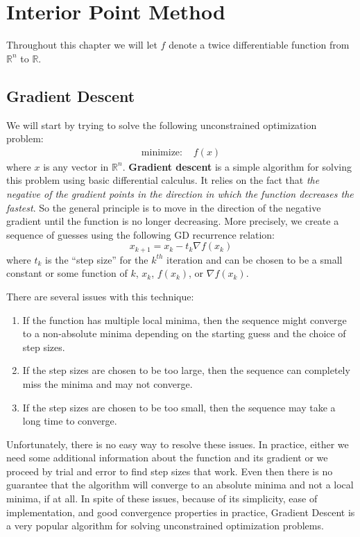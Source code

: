 \documentclass[
]{book}
\providecommand{\tightlist}{%
  \setlength{\itemsep}{0pt}\setlength{\parskip}{0pt}}
\theoremstyle{definition}
\theoremstyle{definition}
\theoremstyle{definition}
\theoremstyle{definition}
\theoremstyle{remark}
\begin{document}
\hypertarget{interior-point-method}{%
\chapter{Interior Point Method}\label{interior-point-method}}

Throughout this chapter we will let \(f\) denote a twice differentiable function from \(\mathbb{R}^n\) to \(\mathbb{R}\).

\hypertarget{gradient-descent}{%
\section{Gradient Descent}\label{gradient-descent}}

We will start by trying to solve the following unconstrained optimization problem:
\begin{align*}
  \mbox{minimize: } & f(x)
\end{align*}
where \(x\) is any vector in \(\mathbb{R}^n\).
\textbf{Gradient descent} is a simple algorithm for solving this problem using basic differential calculus.
It relies on the fact that \emph{the negative of the gradient points in the direction in which the function decreases the fastest}.
So the general principle is to move in the direction of the negative gradient until the function is no longer decreasing.
More precisely, we create a sequence of guesses using the following GD recurrence relation:
\[x_{k+1} = x_k - t_k \nabla f(x_k)\]
where \(t_k\) is the ``step size'' for the \(k^{th}\) iteration and can be chosen to be a small constant or some function of \(k\), \(x_k\), \(f(x_k)\), or \(\nabla f(x_k)\).

There are several issues with this technique:

\begin{enumerate}
\def\labelenumi{\arabic{enumi}.}
\tightlist
\item
  If the function has multiple local minima, then the sequence might converge to a non-absolute minima depending on the starting guess and the choice of step sizes.
\item
  If the step sizes are chosen to be too large, then the sequence can completely miss the minima and may not converge.
\item
  If the step sizes are chosen to be too small, then the sequence may take a long time to converge.
\end{enumerate}

Unfortunately, there is no easy way to resolve these issues. In practice, either we need some additional information about the function and its gradient or we proceed by trial and error to find step sizes that work. Even then there is no guarantee that the algorithm will converge to an absolute minima and not a local minima, if at all. In spite of these issues, because of its simplicity, ease of implementation, and good convergence properties in practice, Gradient Descent is a very popular algorithm for solving unconstrained optimization problems.
\end{document}
